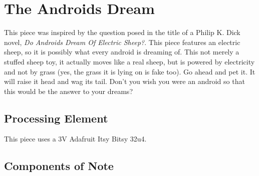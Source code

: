 %
%
%
%
% 
%
%
%
%
%
% 
%

\section{The Androids Dream}

This piece was inspired by the question posed in the title of a Philip K. Dick
novel, \textit{Do Androids Dream Of Electric Sheep?}. This piece features an
electric sheep, so it is possibly what every android is dreaming of. This not
merely a stuffed sheep toy, it actually moves like a real sheep, but is
powered by electricity and not by grass (yes, the grass it is lying on is fake
too). Go ahead and pet it. It will raise it head and wag its tail. Don't you
wish you were an android so that this would be the answer to your dreams?

\subsection*{Processing Element}

This piece uses a 3V Adafruit Itsy Bitsy 32u4.

\subsection*{Components of Note}

